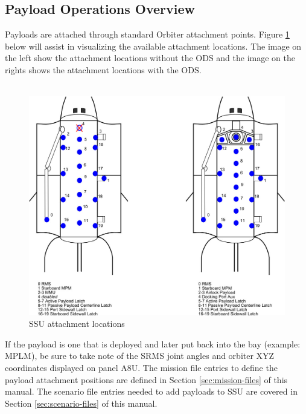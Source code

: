 \documentclass[13pt]{article}
\begin{document}
\subsection{Payload Operations Overview}
Payloads are attached through standard Orbiter attachment points. Figure \ref{fig:SSUAttachments} below will assist in visualizing the available attachment locations. The image on the left show the attachment locations without the ODS and the image on the rights shows the attachment locations with the ODS.\\
\\
\begin{figure}[H]
  \centering
  \includegraphics[width=1\textwidth]{SSU_Attachments.png}
  \caption{SSU attachment locations}
  \label{fig:SSUAttachments}
\end{figure}
If the payload is one that is deployed and later put back into the bay (example: MPLM), be sure to take note of the SRMS joint angles and orbiter XYZ coordinates displayed on panel A8U.
The mission file entries to define the payload attachment positions are defined in Section \ref{sec:mission-files} of this manual.
The scenario file entries needed to add payloads to SSU are covered in Section \ref{sec:scenario-files} of this manual. \\
\end{document}
